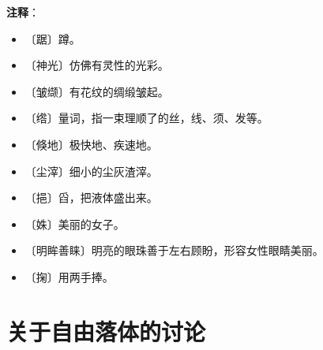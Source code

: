 \documentclass[12pt,UTF-8,openany]{ctexbook}
\begin{document}
\newpage

\textbf{注释}：

\vspace{-1em}

\begin{itemize}
    \setlength\itemsep{-0.2em}
    \item 〔踞〕蹲。
    \item 〔神光〕仿佛有灵性的光彩。
    \item 〔皱缬〕有花纹的绸缎皱起。
    \item 〔绺〕量词，指一束理顺了的丝，线、须、发等。
    \item 〔倏地〕极快地、疾速地。
    \item 〔尘滓〕细小的尘灰渣滓。
    \item 〔挹〕舀，把液体盛出来。
    \item 〔姝〕美丽的女子。
    \item 〔明眸善睐〕明亮的眼珠善于左右顾盼，形容女性眼睛美丽。
    \item 〔掬〕用两手捧。
\end{itemize}

\chapter{关于自由落体的讨论}
\end{document}

